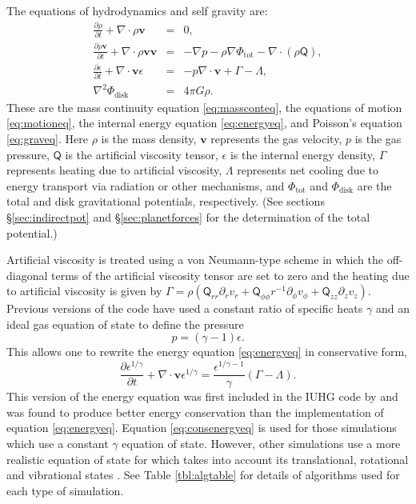 The equations of hydrodynamics and self gravity are:
\begin{eqnarray}
\frac{\partial \rho}{\partial t} + \nabla \cdot \rho \boldsymbol{v} & = & 0,\label{eq:massconteq}\\
\frac{\partial \rho \boldsymbol{v}}{\partial t} + \nabla \cdot \rho \boldsymbol{vv} & = & -\nabla p - \rho \nabla \Phi_{\mathrm{tot}} - \nabla \cdot (\rho \mathsf{Q}),\label{eq:motioneq}\\
\frac{\partial \epsilon}{\partial t} + \nabla \cdot \boldsymbol{v} \epsilon & = & - p \nabla \cdot \boldsymbol{v} + \Gamma - \Lambda,\label{eq:energyeq}\\
\nabla^2 \Phi_{\mathrm{disk}} & = & 4 \pi G \rho\label{eq:graveq}.
\end{eqnarray}
These are the mass continuity equation \eqref{eq:massconteq}, the equations of motion \eqref{eq:motioneq}, the internal energy equation \eqref{eq:energyeq}, and Poisson's equation \eqref{eq:graveq}. Here $\rho$ is the mass density, $\boldsymbol{v}$ represents the gas velocity, $p$ is the gas pressure, $\mathsf{Q}$ is the artificial viscosity tensor, $\epsilon$ is the internal energy density, $\Gamma$ represents heating due to artificial viscosity, $\Lambda$ represents net cooling due to energy transport via radiation or other mechanisms, and $\Phi_{\mathrm{tot}}$ and $\Phi_{\mathrm{disk}}$ are the total and disk gravitational potentials, respectively. (See sections \S\ref{sec:indirectpot} and \S\ref{sec:planetforces} for the determination of the total potential.)

Artificial viscosity is treated using a von Neumann-type scheme \citep{norman1986} in which the off-diagonal terms of the artificial viscosity tensor are set to zero and the heating due to artificial viscosity is given by $\Gamma = \rho(\mathsf{Q}_{rr}\partial_r v_r + \mathsf{Q}_{\phi\phi} r^{-1}\partial_\phi v_\phi + \mathsf{Q}_{zz} \partial_z v_z)$. Previous versions of the code have used a constant ratio of specific heats $\gamma$ and an ideal gas equation of state to define the pressure
\begin{equation}
p = (\gamma - 1)\epsilon. 
\label{eq:idealpres}
\end{equation}
This allows one to rewrite the energy equation \eqref{eq:energyeq} in conservative form,
\begin{equation}
\frac{\partial \epsilon^{1/ \gamma}}{\partial t} +\nabla \cdot \boldsymbol{v} \epsilon^{1/ \gamma} = \frac{\epsilon^{1/ \gamma-1}}{\gamma} (\Gamma - \Lambda). \label{eq:consenergyeq}
\end{equation}
This version of the energy equation was first included in the IUHG code by \citet{pickettphd1995} and was found to produce better energy conservation than the implementation of equation \eqref{eq:energyeq}. Equation \eqref{eq:consenergyeq} is used for those simulations which use a constant $\gamma$ equation of state. However, other simulations use a more realistic equation of state for  which takes into account its translational, rotational and vibrational states \citep{boley2007a}. See Table \ref{tbl:algtable} for details of algorithms used for each type of simulation.

